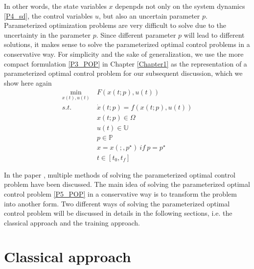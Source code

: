 \documentclass  [
  paper    = a4,
  BCOR     = 10mm,
  twoside,
  fontsize = 12pt,
  fleqn,
  toc      = bibnumbered,
  toc      = listofnumbered,
  numbers  = noendperiod,
  headings = normal,
  listof   = leveldown,
  version  = 3.03
]                                       {scrreprt}
\newcommand{\<}{\langle}
\renewcommand{\>}{\rangle}
\begin{document}
In other words, the state variables $x$ depenpds not only on the system dynamics \ref{P4_sd}, the control variables $u$, but also an uncertain parameter $p$. Parameterized optimization problems are very difficult to solve due to the uncertainty in the parameter $p$. Since different parameter $p$ will lead to different solutions, it makes sense to solve the parameterized optimal control problems in a conservative way. For simplicity and the sake of generalization, we use the more compact formulation \ref{P3_POP} in  Chapter \ref{Chapter1} as the representation of a parameterized optimal control problem for our subsequent discussion, which we show  here again
      \begin{equation}
	\begin{aligned}
	\underset{x(t), u(t)}{\text{min}}  \ &  F(x(t;p), u(t)) \\
	s.t.\ \  &  \dot{x} (t;p) = f(x(t;p), u(t))\\ 
	& x(t;p) \in \Omega \\
	& u(t) \in \mathbb{U}  \\
	& p  \in   \mathbb{P}  \\
	& x = x(;,p^\star) \ if \ p = p^\star \\
	& t \in [t_0, t_f]
\end{aligned}
	\label{P5_POP}
\end{equation}

 In the paper \cite{MatSch22}, multiple methods of solving the parameterized optimal control problem have been discussed. The main idea of solving the parameterized optimal control problem \ref{P5_POP}  in a conservative way is to transform the problem into another form. Two different ways of solving the parameterized optimal control problem will be discussed in details in the following sections, i.e. the classical approach and the training approach. 



\section{Classical approach}
\label{Sec:CA}
\end{document}
